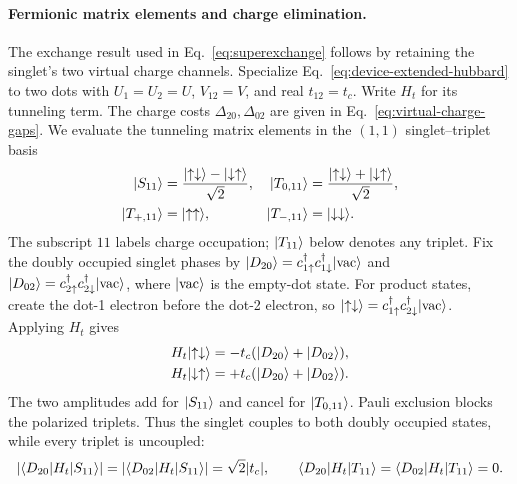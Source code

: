 \paragraph{Fermionic matrix elements and charge elimination.}
The exchange result used in Eq.~\eqref{eq:superexchange} follows
by retaining the singlet's two virtual charge channels. Specialize
Eq.~\eqref{eq:device-extended-hubbard} to two dots with
$U_1=U_2=U$, $V_{12}=V$, and real $t_{12}=t_c$.
Write $H_t$ for its tunneling term.
The charge costs $\Delta_{20},\Delta_{02}$ are given in
Eq.~\eqref{eq:virtual-charge-gaps}.
We evaluate the tunneling matrix elements in the $(1,1)$
singlet--triplet basis
\begin{equation}
  \begin{aligned}
    \ket{S_{11}}&=\frac{\ket{\uparrow\downarrow}
                          -\ket{\downarrow\uparrow}}{\sqrt{2}},&
    \ket{T_{0,11}}&=\frac{\ket{\uparrow\downarrow}
                            +\ket{\downarrow\uparrow}}{\sqrt{2}},\\
    \ket{T_{+,11}}&=\ket{\uparrow\uparrow},&
    \ket{T_{-,11}}&=\ket{\downarrow\downarrow}.
  \end{aligned}
  \label{eq:hubbard-spin-states}
\end{equation}
The subscript $11$ labels charge occupation; $\lvert T_{11}\rangle$ below
denotes any triplet. Fix the doubly occupied singlet phases by
$\lvert D_{20}\rangle=c_{1\uparrow}^\dagger c_{1\downarrow}^\dagger
\lvert \mathrm{vac}\rangle$ and
$\lvert D_{02}\rangle=c_{2\uparrow}^\dagger c_{2\downarrow}^\dagger
\lvert \mathrm{vac}\rangle$, where $\lvert \mathrm{vac}\rangle$ is the empty-dot state.
For product states, create the dot-1 electron before the dot-2
electron, so
$\lvert \uparrow\downarrow\rangle=c_{1\uparrow}^\dagger
c_{2\downarrow}^\dagger\lvert \mathrm{vac}\rangle$. Applying $H_t$ gives
\begin{equation}
  \begin{aligned}
    H_t\ket{\uparrow\downarrow}
       &=-t_c(\ket{D_{20}}+\ket{D_{02}}),\\
    H_t\ket{\downarrow\uparrow}
       &=+t_c(\ket{D_{20}}+\ket{D_{02}}).
  \end{aligned}
  \label{eq:tunneling-product-states}
\end{equation}
The two amplitudes add for $\lvert S_{11}\rangle$ and cancel for
$\lvert T_{0,11}\rangle$. Pauli exclusion blocks the polarized triplets.
Thus the singlet couples to both doubly occupied states, while
every triplet is uncoupled:
\begin{equation}
  |\bra{D_{20}}H_t\ket{S_{11}}|
   =|\bra{D_{02}}H_t\ket{S_{11}}|=\sqrt{2}|t_c|,\qquad
  \bra{D_{20}}H_t\ket{T_{11}}=
  \bra{D_{02}}H_t\ket{T_{11}}=0.
  \label{eq:tunnel-singlet-matrix-elements}
\end{equation}

